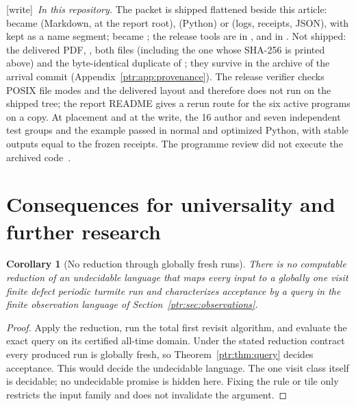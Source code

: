 \documentclass[11pt,letterpaper]{article}
\newtheorem{corollary}[theorem]{Corollary}
\theoremstyle{definition}\newtheorem{definition}[theorem]{Definition}
\theoremstyle{remark}\newtheorem{remark}[theorem]{Remark}
\newcommand{\wtag}{\textup{[write]}}
\begin{document}
{\small\wtag\ \emph{In this repository.} The packet is shipped flattened
beside this article:  became
 (Markdown, at the report root),
 (Python) or  (logs,
receipts, JSON), with  kept as a name segment;
 became ; the release tools
are in , and  in . Not shipped:
the delivered PDF, , both 
files (including the one whose SHA-256 is printed above) and the
byte-identical duplicate  of
; they survive in the archive of the
arrival commit (Appendix~\ref{ptr:app:provenance}). The release verifier
checks POSIX file modes and the delivered layout and therefore does not run
on the shipped tree; the report README gives a rerun route for the six
active programs on a copy. At placement and at the write, the 16 author and
seven independent test groups and the example passed in normal and
optimized Python, with stable outputs equal to the frozen receipts. The
programme review did not execute the archived code~\cite{review38}.\par}

\section{Consequences for universality and further research}\label{ptr:sec:consequences}
\begin{corollary}[No reduction through globally fresh runs]\label{ptr:cor:universality}
There is no computable reduction of an undecidable language that maps every input to a globally one visit finite defect periodic turmite run and characterizes acceptance by a query in the finite observation language of Section~\ref{ptr:sec:observations}.
\end{corollary}
\begin{proof}
Apply the reduction, run the total first revisit algorithm, and evaluate the exact query on its certified all-time domain. Under the stated reduction contract every produced run is globally fresh, so Theorem~\ref{ptr:thm:query} decides acceptance. This would decide the undecidable language. The one visit class itself is decidable; no undecidable promise is hidden here. Fixing the rule or tile only restricts the input family and does not invalidate the argument.
\end{proof}
\end{document}
